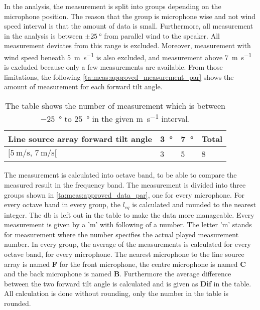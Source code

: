 
In the analysis, the measurement is split into groups depending on the microphone position. The reason that the group is microphone wise and not wind speed interval is that the amount of data is small. Furthermore, all measurement in the analysis is between $\pm\SI{25}{\degree}$ from parallel wind to the speaker.  All measurement deviates from this range is excluded. Moreover, measurement with wind speed beneath \SI{5}{\meter\per\second} is also excluded, and measurement above \SI{7}{\meter\per\second} is excluded because only a few measurements are available.  From those limitations, the following \autoref{ta:meas:approved_measurement_par} shows the amount of measurement for each forward tilt angle. 

\begin{table}[H]
\centering
\caption{The table shows the number of measurement which is between \SI{-25}{\degree} to \SI{25}{\degree} in the given \si{\meter\per\second} interval.}
\begin{tabular}{l|l|l|l}
Line source array forward tilt angle & \SI{3}{\degree}  & \SI{7}{\degree} & Total \\ \hline
$[\SI{5}{\meter\per\second},\, \SI{7}{\meter\per\second}[  $        & 3  & 5  & 8     \\      
\end{tabular}
\label{ta:meas:approved_measurement_par}
\end{table}

The measurement is calculated into octave band, to be able to compare the measured result in the frequency band. The measurement is divided into three groups shown in \autoref{ta:meas:approved_data_par}, one for every microphone. For every octave band in every group, the $l_{eq}$ is calculated and rounded to the nearest integer. The \si{\decibel} is left out in the table to make the data more manageable. Every measurement is given by a 'm' with following of a number. The letter 'm' stands for measurement where the number specifies the actual played measurement number. In every group, the average of the measurements is calculated for every octave band, for every microphone. The nearest microphone to the line source array is named \textbf{F} for the front microphone, the centre microphone is named \textbf{C} and the back microphone is named \textbf{B}. Furthermore the average difference between the two forward tilt angle is calculated and is given as \textbf{Dif} in the table. All calculation is done without rounding, only the number in the table is rounded.

